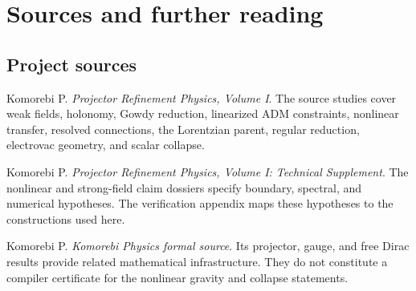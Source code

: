 \begingroup\small{}
\section*{Sources and further reading}
\subsection*{Project sources}
\begin{enumerate}[label={[P\arabic*]},leftmargin=2.5em]
\item Komorebi P. \emph{Projector Refinement Physics, Volume I}. The source studies cover weak fields, holonomy, Gowdy reduction, linearized ADM constraints, nonlinear transfer, resolved connections, the Lorentzian parent, regular reduction, electrovac geometry, and scalar collapse.
\item Komorebi P. \emph{Projector Refinement Physics, Volume I: Technical Supplement}. The nonlinear and strong-field claim dossiers specify boundary, spectral, and numerical hypotheses. The verification appendix maps these hypotheses to the constructions used here.
\item Komorebi P. \emph{Komorebi Physics formal source}. Its projector, gauge, and free Dirac results provide related mathematical infrastructure. They do not constitute a compiler certificate for the nonlinear gravity and collapse statements.
\end{enumerate}

